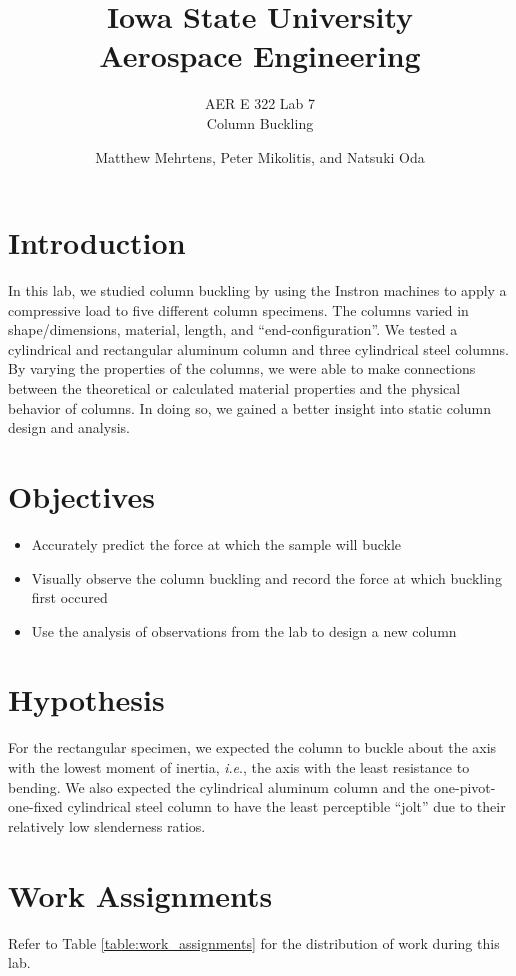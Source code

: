 \documentclass[12 pt]{article}
\title{\textbf{Iowa State University
\\{\Large Aerospace Engineering}}}
\subtitle{AER E 322 Lab 7\\
		  Column Buckling}
\author{Matthew Mehrtens, Peter Mikolitis, and Natsuki Oda}
\newcommand{\ie}{\textit{i}.\textit{e}., }
\begin{document}
\maketitle
\tableofcontents
\section{Introduction} \label{introduction}
In this lab, we studied column buckling by using the Instron machines to apply a compressive load to five different column specimens. The columns varied in shape/dimensions, material, length, and ``end-configuration''. We tested a cylindrical and rectangular aluminum column and three cylindrical steel columns. By varying the properties of the columns, we were able to make connections between the theoretical or calculated material properties and the physical behavior of columns. In doing so, we gained a better insight into static column design and analysis.

\section{Objectives} \label{objectives}
\begin{itemize}
	\item Accurately predict the force at which the sample will buckle
	\item Visually observe the column buckling and record the force at which buckling first occured
	\item Use the analysis of observations from the lab to design a new column
\end{itemize}

\section{Hypothesis} \label{hypothesis}
For the rectangular specimen, we expected the column to buckle about the axis with the lowest moment of inertia, \ie the axis with the least resistance to bending. We also expected the cylindrical aluminum column and the one-pivot-one-fixed cylindrical steel column to have the least perceptible ``jolt'' due to their relatively low slenderness ratios.

\section{Work Assignments} \label{work_assignments}
Refer to Table \ref{table:work_assignments} for the distribution of work during this lab.
\end{document}

